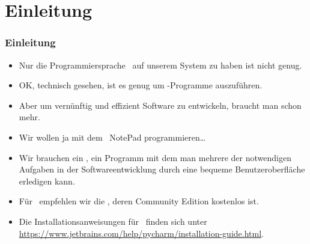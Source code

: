 \documentclass[aspectratio=169,mathserif,notheorems]{beamer}%
\subtitle{PyCharm Installieren}%
\begin{document}
%
%
\startPresentation%
%
\section{Einleitung}%
%
\begin{frame}[t]%
\frametitle{Einleitung}%
\begin{itemize}%
\item Nur die Programmiersprache \python\ auf unserem System zu haben ist nicht genug.%
\item<2-> OK, technisch gesehen, ist es genug um \python-Programme auszuführen.%
\item<3-> Aber um vernünftig und effizient Software zu entwickeln, braucht man schon mehr.%
\item<4-> Wir wollen ja mit dem \microsoftWindows\ NotePad programmieren\dots%
\item<6-> Wir brauchen ein , ein Programm mit dem man mehrere der notwendigen Aufgaben in der Softwareentwicklung durch eine bequeme Benutzeroberfläche erledigen kann.%
\item<7-> Für \python\ empfehlen wir die \pycharm\cite{VHN2023HOADWP,Y2022PPADT,W2024PME} , deren Community Edition kostenlos ist.%
\item<8-> Die Installationsanweisungen für \pycharm\ finden sich unter \url{https://www.jetbrains.com/help/pycharm/installation-guide.html}.%
\end{itemize}%
%
%
\end{frame}%
%
\end{document}
